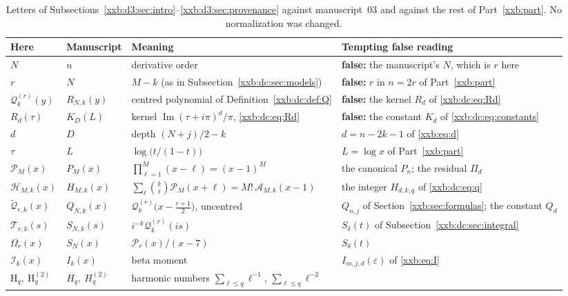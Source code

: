 \documentclass[11pt,a4paper]{article}
\numberwithin{equation}{section}
\theoremstyle{definition}
\theoremstyle{remark}
\theoremstyle{plain}
\newcommand{\fall}[2]{#1^{\underline{#2}}}
\begin{document}
\begin{table}[ht]
\centering\small
\caption{Letters of Subsections~\ref{xxb:d3:sec:intro}--\ref{xxb:d3:sec:provenance}
against manuscript~03 and against the rest of Part~\ref{xxb:part}.  No
normalization was changed.}\label{xxb:d3:tab:notation}
\begin{tabular}{@{}>{\raggedright\arraybackslash}p{}
 >{\raggedright\arraybackslash}p{}
 >{\raggedright\arraybackslash}p{}
 >{\raggedright\arraybackslash}p{}@{}}
\toprule
Here & Manuscript & Meaning & Tempting false reading\\
\midrule
$N$ & $n$ & derivative order & \textbf{false:} the manuscript's $N$, which is $r$ here\\
$r$ & $N$ & $M-k$ (as in Subsection~\ref{xxb:dc:sec:models}) & \textbf{false:} $r$ in $n=2r$ of Part~\ref{xxb:part}\\
$\mathcal Q_k^{(r)}(y)$ & $R_{N,k}(y)$ & centred polynomial of Definition~\ref{xxb:dc:def:Q} &
 \textbf{false:} the kernel $R_d$ of \eqref{xxb:dc:eq:Rd}\\
$R_d(\tau)$ & $K_D(L)$ & kernel $\operatorname{Im}(\tau+i\pi)^d/\pi$, \eqref{xxb:dc:eq:Rd} &
 \textbf{false:} the constant $K_d$ of \eqref{xxb:dc:eq:constants}\\
\midrule
$d$ & $D$ & depth $(N+j)/2-k$ & $d=n-2k-1$ of \eqref{xxb:eq:d}\\
$\tau$ & $L$ & $\log\bigl(t/(1-t)\bigr)$ & $L=\log x$ of Part~\ref{xxb:part}\\
$\mathcal P_M(x)$ & $P_M(x)$ & $\prod_{\ell=1}^{M}(x-\ell)=\fall{(x-1)}{M}$ &
 the canonical $P_n$; the residual $\Pi_d$\\
$\mathcal H_{M,k}(x)$ & $H_{M,k}(x)$ & $\sum_\ell\binom k\ell\mathcal P_M(x+\ell)=M!\,\mathcal A_{M,k}(x-1)$ &
 the integer $H_{d,k,q}$ of \eqref{xxb:dc:eq:q}\\
$\widetilde{\mathcal Q}_{r,k}(x)$ & $Q_{N,k}(x)$ & $\mathcal Q_k^{(r)}\bigl(x-\tfrac{r+1}2\bigr)$, uncentred &
 $Q_{n,j}$ of Section~\ref{xxb:sec:formulas}; the constant $Q_d$\\
$\mathcal T_{r,k}(s)$ & $S_{N,k}(s)$ & $i^{-k}\mathcal Q_k^{(r)}(is)$ & $S_\delta(t)$ of Subsection~\ref{xxb:dc:sec:integral}\\
$\Omega_r(x)$ & $S_N(x)$ & $\mathcal P_r(x)/(x-7)$ & $S_\delta(t)$\\
$\mathcal I_k(x)$ & $I_k(x)$ & beta moment & $I_{m,j,d}(\varepsilon)$ of \eqref{xxb:eq:I}\\
$\mathrm H_q,\ \mathrm H_q^{(2)}$ & $H_q,\ H_q^{(2)}$ & harmonic numbers $\sum_{\ell\le q}\ell^{-1}$, $\sum_{\ell\le q}\ell^{-2}$ &

\end{tabular}
\end{table}
\end{document}

